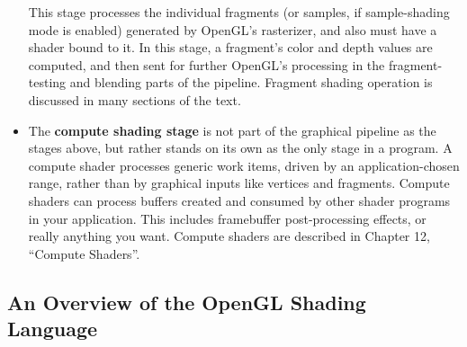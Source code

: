 \documentclass[a4paper, 14pt]{extarticle}
\begin{document}
\begin{itemize}
          This stage processes the individual fragments (or samples, if sample-shading mode is enabled) generated by OpenGL's rasterizer, and also must have a shader bound to it.
          In this stage, a fragment's color and depth values are computed, and then sent for further OpenGL's processing in the fragment-testing and blending parts of the pipeline.
          Fragment shading operation is discussed in many sections of the text.
    \item
          The \textbf{compute shading stage} is not part of the graphical pipeline as the stages above, but rather stands on its own as the only stage in a program.
          A compute shader processes generic work items, driven by an application-chosen range, rather than by graphical inputs like vertices and fragments.
          Compute shaders can process buffers created and consumed by other shader programs in your application.
          This includes framebuffer post-processing effects, or really anything you want.
          Compute shaders are described in Chapter 12, ``Compute Shaders''.

\end{itemize}

\subsection{An Overview of the OpenGL Shading Language}
\end{document}
